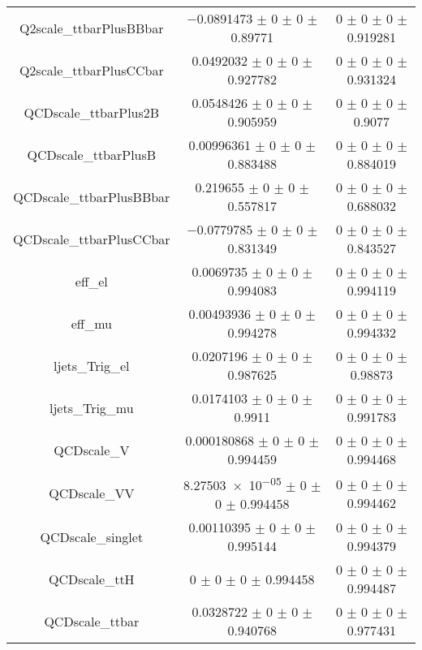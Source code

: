 \begin{table}
\begin{tabular}{ccc}
Q2scale\_ttbarPlusBBbar & \num{-0.0891473} $\pm$ \num{0} $\pm$ \num{0} $\pm$ \num{0.89771} & \num{0} $\pm$ \num{0} $\pm$ \num{0} $\pm$ \num{0.919281}\\
Q2scale\_ttbarPlusCCbar & \num{0.0492032} $\pm$ \num{0} $\pm$ \num{0} $\pm$ \num{0.927782} & \num{0} $\pm$ \num{0} $\pm$ \num{0} $\pm$ \num{0.931324}\\
QCDscale\_ttbarPlus2B & \num{0.0548426} $\pm$ \num{0} $\pm$ \num{0} $\pm$ \num{0.905959} & \num{0} $\pm$ \num{0} $\pm$ \num{0} $\pm$ \num{0.9077}\\
QCDscale\_ttbarPlusB & \num{0.00996361} $\pm$ \num{0} $\pm$ \num{0} $\pm$ \num{0.883488} & \num{0} $\pm$ \num{0} $\pm$ \num{0} $\pm$ \num{0.884019}\\
QCDscale\_ttbarPlusBBbar & \num{0.219655} $\pm$ \num{0} $\pm$ \num{0} $\pm$ \num{0.557817} & \num{0} $\pm$ \num{0} $\pm$ \num{0} $\pm$ \num{0.688032}\\
QCDscale\_ttbarPlusCCbar & \num{-0.0779785} $\pm$ \num{0} $\pm$ \num{0} $\pm$ \num{0.831349} & \num{0} $\pm$ \num{0} $\pm$ \num{0} $\pm$ \num{0.843527}\\
eff\_el & \num{0.0069735} $\pm$ \num{0} $\pm$ \num{0} $\pm$ \num{0.994083} & \num{0} $\pm$ \num{0} $\pm$ \num{0} $\pm$ \num{0.994119}\\
eff\_mu & \num{0.00493936} $\pm$ \num{0} $\pm$ \num{0} $\pm$ \num{0.994278} & \num{0} $\pm$ \num{0} $\pm$ \num{0} $\pm$ \num{0.994332}\\
ljets\_Trig\_el & \num{0.0207196} $\pm$ \num{0} $\pm$ \num{0} $\pm$ \num{0.987625} & \num{0} $\pm$ \num{0} $\pm$ \num{0} $\pm$ \num{0.98873}\\
ljets\_Trig\_mu & \num{0.0174103} $\pm$ \num{0} $\pm$ \num{0} $\pm$ \num{0.9911} & \num{0} $\pm$ \num{0} $\pm$ \num{0} $\pm$ \num{0.991783}\\
QCDscale\_V & \num{0.000180868} $\pm$ \num{0} $\pm$ \num{0} $\pm$ \num{0.994459} & \num{0} $\pm$ \num{0} $\pm$ \num{0} $\pm$ \num{0.994468}\\
QCDscale\_VV & \num{8.27503e-05} $\pm$ \num{0} $\pm$ \num{0} $\pm$ \num{0.994458} & \num{0} $\pm$ \num{0} $\pm$ \num{0} $\pm$ \num{0.994462}\\
QCDscale\_singlet & \num{0.00110395} $\pm$ \num{0} $\pm$ \num{0} $\pm$ \num{0.995144} & \num{0} $\pm$ \num{0} $\pm$ \num{0} $\pm$ \num{0.994379}\\
QCDscale\_ttH & \num{0} $\pm$ \num{0} $\pm$ \num{0} $\pm$ \num{0.994458} & \num{0} $\pm$ \num{0} $\pm$ \num{0} $\pm$ \num{0.994487}\\
QCDscale\_ttbar & \num{0.0328722} $\pm$ \num{0} $\pm$ \num{0} $\pm$ \num{0.940768} & \num{0} $\pm$ \num{0} $\pm$ \num{0} $\pm$ \num{0.977431}\\

\end{tabular}
\end{table}
